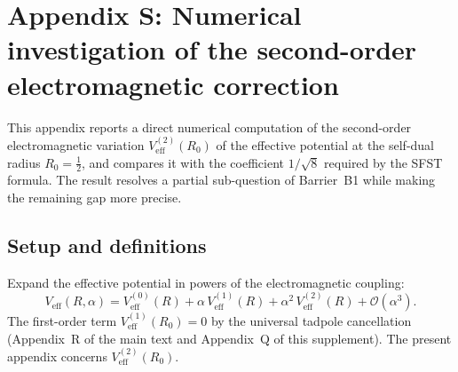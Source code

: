 
\section{Appendix S: Numerical investigation of the second-order
  electromagnetic correction}
\label{app:B1computation}

This appendix reports a direct numerical computation of the
second-order electromagnetic variation
$V_{\mathrm{eff}}^{(2)}(R_0)$ of the effective potential at the
self-dual radius $R_0=\tfrac{1}{2}$, and compares it with the
coefficient $1/\sqrt{8}$ required by the SFST formula.  The result
resolves a partial sub-question of Barrier~B1 while making the
remaining gap more precise.

\subsection{Setup and definitions}
\label{ssec:B1setup}

Expand the effective potential in powers of the electromagnetic
coupling:
\begin{equation}
  \label{eq:VeffExpand}
  V_{\mathrm{eff}}(R,\alpha)
    = V_{\mathrm{eff}}^{(0)}(R)
    + \alpha\,V_{\mathrm{eff}}^{(1)}(R)
    + \alpha^2\,V_{\mathrm{eff}}^{(2)}(R)
    + \mathcal{O}(\alpha^3).
\end{equation}
The first-order term $V_{\mathrm{eff}}^{(1)}(R_0)=0$ by the universal
tadpole cancellation (Appendix~R of the main text and Appendix~Q of
this supplement).  The present appendix concerns
$V_{\mathrm{eff}}^{(2)}(R_0)$.

